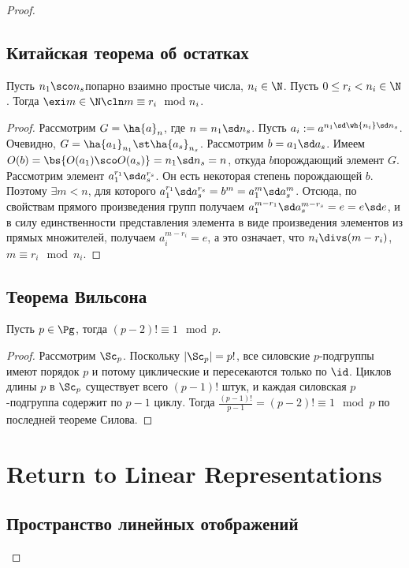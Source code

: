 \documentclass[a4paper]{article}
\begin{document}
\begin{proof}
\subsection{Китайская теорема об остатках}

\begin{theorem}
Пусть $n_1\sco n_s$\т попарно взаимно простые числа,
$n_i \in \N$. Пусть $0 \le r_i < n_i \in \N$. Тогда $\exi m \in \N\cln m \equiv r_i \mod n_i$.
\end{theorem}
\begin{proof}
Рассмотрим $G = \ha{a}_n$, где
$n=n_1\sd n_s$. Пусть $a_i := a^{n_1\sd \wh{n_i}\sd n_s}$.
Очевидно, $G = \ha{a_1}_{n_1}\st \ha{a_s}_{n_s}$. Рассмотрим $b =
a_1\sd a_s$. Имеем $O(b)=\bs{O(a_1)\sco O(a_s)}=n_1\sd n_s=n$,
откуда $b$\т порождающий элемент $G$. Рассмотрим элемент
$a_1^{r_1}\sd a_s^{r_s}$. Он есть некоторая степень порождающей
$b$. Поэтому $\exi m < n$, для которого $a_1^{r_1}\sd
a_s^{r_s}=b^m=a_1^m\sd a_s^m$. Отсюда, по свойствам прямого
произведения групп получаем $a_1^{m-r_1}\sd a_s^{m-r_s}=e=e\sd e$,
и в силу единственности представления элемента в виде произведения
элементов из прямых множителей, получаем $a_i^{m-r_i}=e$, а это
означает, что $n_i \divs (m-r_i)$,  $m \equiv r_i \mod n_i$.
\end{proof}

\subsection{Теорема Вильсона}

\begin{theorem}[Вильсона]
Пусть $p \in \Pg$, тогда $(p-2)! \equiv 1 \mod p$.
\end{theorem}
\begin{proof}
Рассмотрим $\Sc_p$. Поскольку $|\Sc_p|=p!$, все силовские $p$-подгруппы имеют порядок $p$ и потому
циклические и пересекаются только по $\id$. Циклов длины $p$ в $\Sc_p$ существует всего $(p-1)!$ штук, и
каждая силовская $p$-подгруппа содержит по $p-1$ циклу. Тогда $\frac{(p-1)!}{p-1}=(p-2)!  \equiv 1 \mod p$ по
последней теореме Силова.
\end{proof}

\section{Return to Linear Representations}

\subsection{Пространство линейных отображений}


\end{proof}
\end{document}
